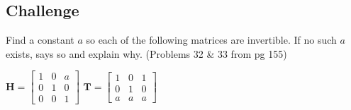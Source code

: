 \documentclass{article}
\begin{document}
\begin{flushleft}
\begin{center}
\section{Challenge}
\end{center}
Find a constant $a$ so each of the following matrices are invertible. If no such $a$ exists, says so and explain why. (Problems 32 \& 33 from pg 155)\\
\begin{center}
$\textbf{H}= \begin{bmatrix}
1 & 0 & a\\
0 & 1 & 0\\
0 & 0 & 1
\end{bmatrix} $
\hspace{1in}
$\textbf{T}= \begin{bmatrix}
1 & 0 & 1\\
0 & 1 & 0\\
a & a & a
\end{bmatrix} $
\end{center}

\end{flushleft}
\end{document}
